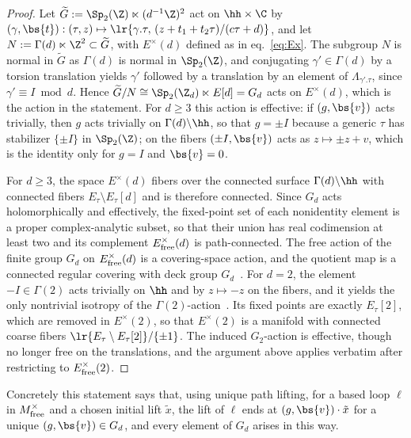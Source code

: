 \documentclass[a4paper, aps, pra, 11pt, onecolumn, tightenlines, superscriptaddress]{revtex4-2}
\begin{document}
\begin{proof}
Let $\widetilde G:=\Sp_2(\Z)\ltimes(d^{-1}\Z)^2$ act on $\hh\times\C$ by
$(\gamma,\bs{t}):(\tau,z)\mapsto\lr{\gamma.\tau,\,(z+t_1+t_2\tau)/(c\tau+d)}$, and let
$N:=\Gamma(d)\ltimes\Z^2\subset\widetilde G$, with
$E^{\times}(d)$ defined as in eq.~\eqref{eq:Ex}. %
%
The subgroup $N$ is normal in $\widetilde G$ as $\Gamma(d)$ is normal in $\Sp_2(\Z)$, and
conjugating $\gamma'\in\Gamma(d)$ by a torsion translation yields $\gamma'$ followed by a
translation by an element of $\Lambda_{\gamma'.\tau}$, since $\gamma'\equiv I \bmod d$.
%
Hence $\widetilde G/N\cong\Sp_2(\Z_d)\ltimes E[d]=G_d$ acts on $E^{\times}(d)$, which is
the action in the statement. For $d\geq3$ this action is effective: if $(g,\bs{v})$ acts
trivially, then $g$ acts trivially on $\Gamma(d)\backslash\hh$, so that $g=\pm I$ because a
generic $\tau$ has stabilizer $\{\pm I\}$ in $\Sp_2(\Z)$; on the fibers $(\pm I,\bs{v})$
acts as $z\mapsto\pm z+v$, which is the identity only for $g=I$ and $\bs{v}=0$.

For $d\geq3$, the space $E^{\times}(d)$ fibers over the connected surface $\Gamma(d)\backslash\hh$ with
connected fibers $E_\tau\setminus E_\tau[d]$ and is therefore connected. Since $G_d$ acts
holomorphically and effectively, the fixed-point set of each nonidentity element is a
proper complex-analytic subset, so that their union has real codimension at least two and
its complement $E^{\times}_{\rm free}(d)$ is path-connected. The free action of the finite
group $G_d$ on $E^{\times}_{\rm free}(d)$ is a covering-space action, and the quotient map
is a connected regular covering with deck group $G_d$~\cite[Prop.~1.40]{Hatcher}. %
For $d=2$, the element $-I\in\Gamma(2)$ acts trivially on $\hh$ and by $z\mapsto-z$ on the fibers, and it yields the only nontrivial isotropy of the $\Gamma(2)$-action~\cite{hain2014lectures}. Its fixed points are exactly $E_\tau[2]$,
which are removed in $E^{\times}(2)$, so that $E^{\times}(2)$ is a manifold with connected
coarse fibers $\lr{E_\tau\setminus E_\tau[2]}/\{\pm1\}$. The induced $G_2$-action is
effective, though no longer free on the translations, and the argument above applies
verbatim after restricting to $E^{\times}_{\rm free}(2)$.
\end{proof}
%
Concretely this statement says that, using unique path lifting, for a based loop
$\ell$ in $M^{\times}_{\rm free}$ and a chosen initial lift $\tilde x$, the lift of $\ell$
ends at $(g,\bs{v})\cdot\tilde x$ for a unique $(g,\bs{v})\in G_d$, and every element of
$G_d$ arises in this way. 
\end{document}
